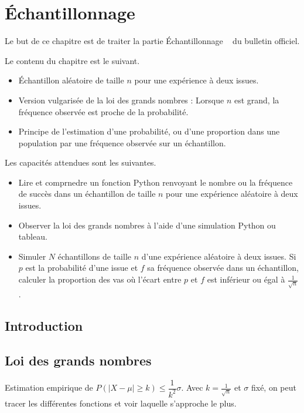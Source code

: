 
\chapter{Échantillonnage}

Le but de ce chapitre est de traiter la partie \og Échantillonnage \fg~ du bulletin officiel.

Le contenu du chapitre est le suivant.
	\begin{itemize}
		\item Échantillon aléatoire de taille $n$ pour une expérience à deux issues.
		\item Version vulgarisée de la loi des grands nombres : \og Lorsque $n$ est grand, la fréquence observée est proche de la probabilité. \fg
		\item Principe de l'estimation d'une probabilité, ou d'une proportion dans une population par une fréquence observée sur un échantillon.
	\end{itemize}

Les capacités attendues sont les suivantes.
	\begin{itemize}
		\item Lire et comprnedre un fonction Python renvoyant le nombre ou la fréquence de succès dans un échantillon de taille $n$ pour une expérience aléatoire à deux issues.
		\item Observer la loi des grands nombres à l'aide d'une simulation Python ou tableau.
		\item Simuler $N$ échantillons de taille $n$ d'une expérience aléatoire à deux issues. Si $p$ est la probabilité d'une issue et $f$ sa fréquence observée dans un échantillon, calculer la proportion des vas où l'écart entre $p$ et $f$ est inférieur ou égal à $\frac1{\sqrt{n}}$.
	\end{itemize}

\section{Introduction}

\section{Loi des grands nombres}

Estimation empirique de $P(|X - \mu| \geq k) \leq \dfrac1{k^2} \sigma$.
Avec $k = \frac1{\sqrt{n}}$ et $\sigma$ fixé, on peut tracer les différentes fonctions et voir laquelle s'approche le plus.